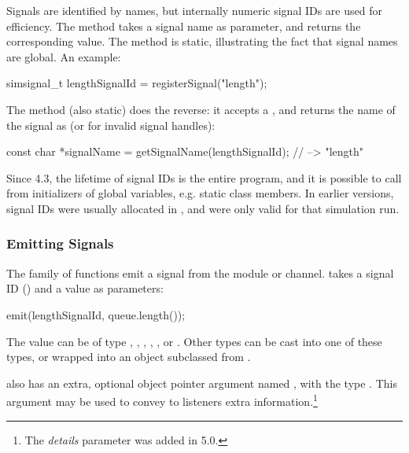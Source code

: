 Signals are identified by names, but internally numeric signal IDs are used
for efficiency. The  method takes a signal name as
parameter, and returns the corresponding  value.
The method is static, illustrating the fact that signal names are global.
An example:

\begin{cpp}
simsignal_t lengthSignalId = registerSignal("length");
\end{cpp}

The  method (also static) does the reverse:
it accepts a , and returns the name of the signal as
 (or  for invalid signal handles):

\begin{cpp}
const char *signalName = getSignalName(lengthSignalId); // --> "length"
\end{cpp}

\begin{note}
  Since {\opp} 4.3, the lifetime of signal IDs is the entire program, and
  it is possible to call  from initializers of
  global variables, e.g. static class members. In earlier versions,
  signal IDs were usually allocated in , and were
  only valid for that simulation run.
\end{note}

\subsubsection{Emitting Signals}
\label{sec:simple-modules:emitting-signals}

The  family of functions emit a signal from the module or
channel.  takes a signal ID () and
a value as parameters:

\begin{cpp}
emit(lengthSignalId, queue.length());
\end{cpp}

The value can be of type , , , ,
, or . Other types can be cast into
one of these types, or wrapped into an object subclassed from .

 also has an extra, optional object pointer argument named
, with the type . This argument may be used
to convey to listeners extra information.\footnote{The \textit{details}
parameter was added in {\opp} 5.0.}

